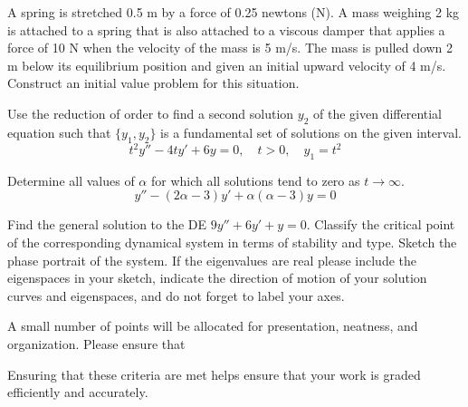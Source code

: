 \documentclass[12pt]{exam}
\begin{document}
    


\newpage

\begin{questions}




    \newpage
    \question[4] A spring is stretched 0.5 m by a force of 0.25 newtons (N). A mass weighing 2 kg is attached to a spring that is also attached to a viscous damper that applies a force of 10 N when the velocity of the mass is 5 m/s. The mass is pulled down 2 m below its equilibrium position and given an initial upward velocity of 4 m/s. Construct an initial value problem for this  situation. %
    
    \newpage
    \question[6] Use the reduction of order to find a second solution $y_2$ of the given differential equation such that $\{ y_1 , y_2 \}$ is a fundamental set of solutions on the given interval. $$ t^2y''-4ty'+6y = 0, \quad t > 0, \quad y_1=t^2
    $$ %
    
    \newpage
    \question[3]
    Determine all values of $\alpha$ for which all solutions tend to zero as $t \to \infty$. $$y''-(2\alpha -3)y'+\alpha(\alpha-3)y = 0$$ %
    
    \newpage
    \question[6] Find the general solution to the DE $9y''+6y'+y=0$. Classify the critical point of the corresponding dynamical system in terms of stability and type. Sketch the phase portrait of the system. If the eigenvalues are real please include the eigenspaces in your sketch, indicate the direction of motion of your solution curves and eigenspaces, and do not forget to label your axes.  %
    
    

\newpage

    \question[1] A small number of points will be allocated for presentation, neatness, and organization. Please ensure that
    Ensuring that these criteria are met helps ensure that your work is graded efficiently and accurately. 

\end{questions}
\end{document}

